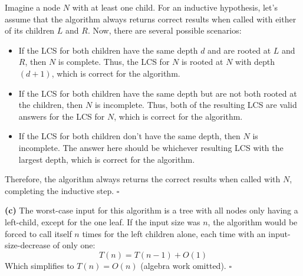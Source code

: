 \documentclass{article}
\begin{document}
\begin{enumerate}
    Imagine a node $N$ with at least one child. For an inductive hypothesis, let's assume that the algorithm always returns correct results when called with either of its children $L$ and $R$. Now, there are several possible scenarios:
    \begin{itemize}
      \item If the LCS for both children have the same depth $d$ and are rooted at $L$ and $R$, then $N$ is complete. Thus, the LCS for $N$ is rooted at $N$ with depth $(d + 1)$, which is correct for the algorithm.
      \item If the LCS for both children have the same depth but are not both rooted at the children, then $N$ is incomplete. Thus, both of the resulting LCS are valid answers for the LCS for $N$, which is correct for the algorithm.
      \item If the LCS for both children don't have the same depth, then $N$ is incomplete. The answer here should be whichever resulting LCS with the largest depth, which is correct for the algorithm.
    \end{itemize}
    Therefore, the algorithm always returns the correct results when called with $N$, completing the inductive step. $\square$

    \textbf{(c)} The worst-case input for this algorithm is a tree with all nodes only having a left-child, except for the one leaf. If the input size was $n$, the algorithm would be forced to call itself $n$ times for the left children alone, each time with an input-size-decrease of only one:
    $$T(n) = T(n - 1) + O(1)$$
    Which simplifies to $T(n) = O(n)$ (algebra work omitted). $\square$

\end{enumerate}
\end{document}
